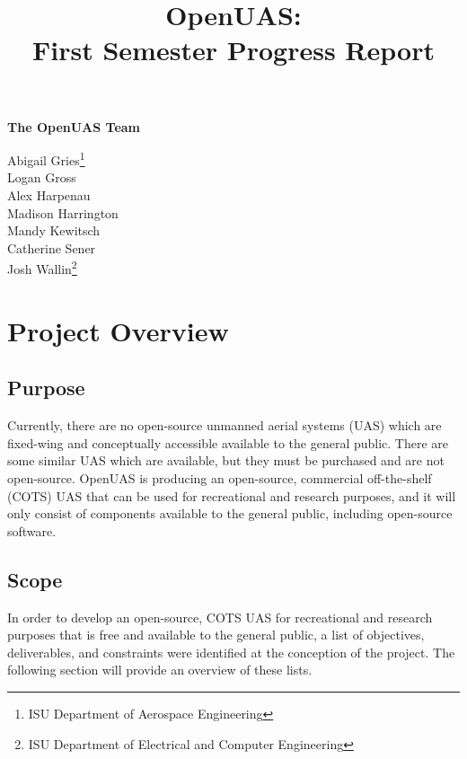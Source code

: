 \documentclass{article}
\title{OpenUAS:\\First Semester Progress Report }
\begin{document}
\maketitle

\newpage

\begin{center}
\Large \textbf{The OpenUAS Team}

\vspace{1cm}

\large{
Abigail Gries\footnote[1]{ISU Department of Aerospace Engineering}\\ Logan Gross\footnotemark[1]\\ Alex Harpenau\footnotemark[1]\\ Madison Harrington\footnotemark[1]\\ Mandy Kewitsch\footnotemark[1]\\ Catherine Sener\footnotemark[1]\\ Josh Wallin\footnote[2]{ISU Department of Electrical and Computer Engineering}
}\par

\end{center}

\newpage


\tableofcontents

\section{Project Overview}

\subsection{Purpose}
Currently, there are no open-source unmanned aerial systems (UAS) which are fixed-wing and conceptually accessible available to the general public. There are some similar UAS which are available, but they must be purchased and are not open-source. OpenUAS is producing an open-source, commercial off-the-shelf (COTS) UAS that can be used for recreational and research purposes, and it will only consist of components available to the general public, including open-source software.

\subsection{Scope}
In order to develop an open-source, COTS UAS for recreational and research purposes that is free and available to the general public, a list of objectives, deliverables, and constraints were identified at the conception of the project. The following section will provide an overview of these lists.
\end{document}
